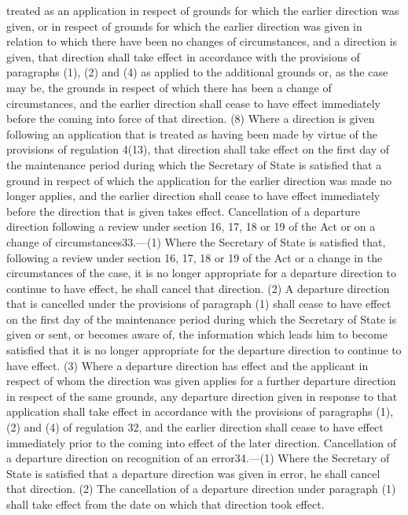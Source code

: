 \documentclass[a4paper]{article}
\begin{document}
treated as an application in respect of grounds for which the earlier direction
was given, or in respect of grounds for which the earlier direction was given in
relation to which there have been no changes of circumstances, and a direction
is given, that direction shall take effect in accordance with the provisions of
paragraphs (1), (2) and (4) as applied to the additional grounds or, as the case
may be, the grounds in respect of which there has been a change of
circumstances, and the earlier direction shall cease to have effect immediately
before the coming into force of that direction.
(8) Where a direction is given following an application that is treated as
having been made by virtue of the provisions of regulation 4(13), that direction
shall take effect on the first day of the maintenance period during which the
Secretary of State is satisfied that a ground in respect of which the
application for the earlier direction was made no longer applies, and the
earlier direction shall cease to have effect immediately before the direction
that is given takes effect.
Cancellation of a departure direction following a review under section 16, 17,
18 or 19 of the Act or on a change of circumstances33.—(1) Where the Secretary
of State is satisfied that, following a review under section 16, 17, 18 or 19 of
the Act or a change in the circumstances of the case, it is no longer
appropriate for a departure direction to continue to have effect, he shall
cancel that direction.
(2) A departure direction that is cancelled under the provisions of paragraph
(1) shall cease to have effect on the first day of the maintenance period during
which the Secretary of State is given or sent, or becomes aware of, the
information which leads him to become satisfied that it is no longer appropriate
for the departure direction to continue to have effect.
(3) Where a departure direction has effect and the applicant in respect of whom
the direction was given applies for a further departure direction in respect of
the same grounds, any departure direction given in response to that application
shall take effect in accordance with the provisions of paragraphs (1), (2) and
(4) of regulation 32, and the earlier direction shall cease to have effect
immediately prior to the coming into effect of the later direction.
Cancellation of a departure direction on recognition of an error34.—(1) Where
the Secretary of State is satisfied that a departure direction was given in
error, he shall cancel that direction.
(2) The cancellation of a departure direction under paragraph (1) shall take
effect from the date on which that direction took effect.
\end{document}

